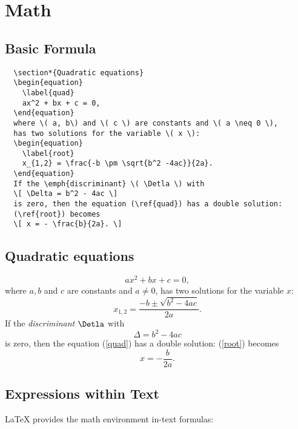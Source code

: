 \chapter{Math}

\section{Basic Formula}

\begin{lstlisting}
  \section*{Quadratic equations}
  \begin{equation}
    \label{quad}
    ax^2 + bx + c = 0,
  \end{equation}
  where \( a, b\) and \( c \) are constants and \( a \neq 0 \),
  has two solutions for the variable \( x \):
  \begin{equation}
    \label{root}
    x_{1,2} = \frac{-b \pm \sqrt{b^2 -4ac}}{2a}.
  \end{equation}
  If the \emph{discriminant} \( \Detla \) with
  \[ \Delta = b^2 - 4ac \]
  is zero, then the equation (\ref{quad}) has a double solution:
  (\ref{root}) becomes
  \[ x = - \frac{b}{2a}. \]
\end{lstlisting}

\begin{tcolorbox}
  \section*{Quadratic equations}
  \begin{equation}
    \label{quad}
    ax^2 + bx + c = 0,
  \end{equation}
  where \( a, b\) and \( c \) are constants and \( a \neq 0 \),
  has two solutions for the variable \( x \):
  \begin{equation}
    \label{root}
    x_{1,2} = \frac{-b \pm \sqrt{b^2 -4ac}}{2a}.
  \end{equation}
  If the \emph{discriminant} \( \Detla \) with
  \[ \Delta = b^2 - 4ac \]
  is zero, then the equation (\ref{quad}) has a double solution:
  (\ref{root}) becomes
  \[ x = - \frac{b}{2a}. \]

\end{tcolorbox}


\section{Expressions within Text}
LaTeX provides the math environment in-text formulas:

